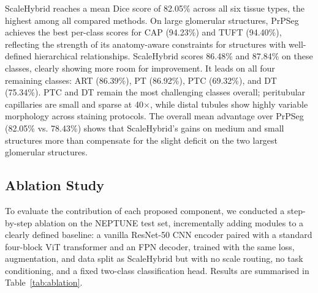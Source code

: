 \documentclass[runningheads]{llncs}
\begin{document}
ScaleHybrid reaches a mean Dice score of 82.05\% across all six tissue types, the highest among all compared methods. On large glomerular structures, PrPSeg achieves the best per-class scores for CAP (94.23\%) and TUFT (94.40\%), reflecting the strength of its anatomy-aware constraints for structures with well-defined hierarchical relationships. ScaleHybrid scores 86.48\% and 87.84\% on these classes, clearly showing more room for improvement. It leads on all four remaining classes: ART (86.39\%), PT (86.92\%), PTC (69.32\%), and DT (75.34\%). PTC and DT remain the most challenging classes overall; peritubular capillaries are small and sparse at 40$\times$, while distal tubules show highly variable morphology across staining protocols. The overall mean advantage over PrPSeg (82.05\% vs. 78.43\%) shows that ScaleHybrid's gains on medium and small structures more than compensate for the slight deficit on the two largest glomerular structures.

\subsection{Ablation Study}

To evaluate the contribution of each proposed component, we conducted a
step-by-step ablation on the NEPTUNE test set, incrementally adding modules
to a clearly defined baseline: a vanilla ResNet-50 CNN encoder paired with a
standard four-block ViT transformer and an FPN decoder, trained with the same
loss, augmentation, and data split as ScaleHybrid but with no scale routing,
no task conditioning, and a fixed two-class classification head.
Results are summarised in Table~\ref{tab:ablation}.
\end{document}
